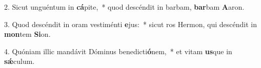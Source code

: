 2. Sicut unguéntum in \textbf{cá}pite,~*  quod descéndit in barbam, \textbf{bar}bam \textbf{A}aron.\

3. Quod descéndit in oram vestiménti \textbf{e}jus:~*  sicut ros Hermon, qui descéndit in \textbf{mon}tem \textbf{Si}on.\

4. Quóniam illic mandávit Dóminus benedicti\textbf{ó}nem,~*  et vitam \textbf{us}que in \textbf{sǽ}culum.\

